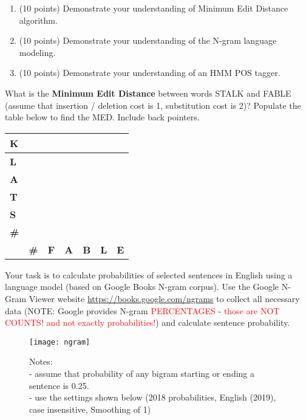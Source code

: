 \documentclass[assignment={2},
duedate={Sunday, February 11, 2024, 11:59 PM CST},
points={30}]{cs581homework}
\begin{document}
\maketitle

\begin{objectives}
	\begin{enumerate}
	    \item (10 points) Demonstrate your understanding of Minimum Edit Distance algorithm.
	    \item (10 points) Demonstrate your understanding of the N-gram language modeling.
	    \item (10 points) Demonstrate your understanding of an HMM POS tagger.
	\end{enumerate}
\end{objectives}

What is the \textbf{Minimum Edit Distance} between words STALK and FABLE (assume that insertion / deletion cost is 1, substitution cost is 2)?
Populate the table below to find the MED\@.
Include back pointers.

\begin{table}[H]
    \centering
	\label{tab:med}
	\begin{tabular}{|*{7}{P{0.12\textwidth}|}}
		\hline
		\textbf{K} &  &  &  &  &  &  \\
		\hline
		\textbf{L} &  &  &  &  &  &  \\
		\hline
		\textbf{A} &  &  &  &  &  &  \\
		\hline
		\textbf{T} &  &  &  &  &  &  \\
		\hline
		\textbf{S} &  &  &  &  &  &  \\
		\hline
		\textbf{\#} &  &  &  &  &  &  \\
		\hline
		& \textbf{\#} & \textbf{F} & \textbf{A} & \textbf{B} & \textbf{L} & \textbf{E} \\
		\hline
	\end{tabular}
\end{table}

Your task is to calculate probabilities of selected sentences in English using a language model (based on Google Books N-gram corpus).
Use the Google N-Gram Viewer website \url{https://books.google.com/ngrams} to collect all necessary data
(NOTE: Google provides N-gram \textcolor{red}{PERCENTAGES} - \textcolor{red}{those are NOT COUNTS! and not exactly probabilities!}) and calculate sentence probability.

\begin{figure}[H]
	\centering
	\caption{Notes: \\ - assume that probability of any bigram starting or ending a sentence is 0.25. \\ - use the settings shown below (2018 probabilities, English (2019), case insensitive, Smoothing of 1)}
	\label{fig:}
	\texttt{[image: ngram]}
\end{figure}
\end{document}
